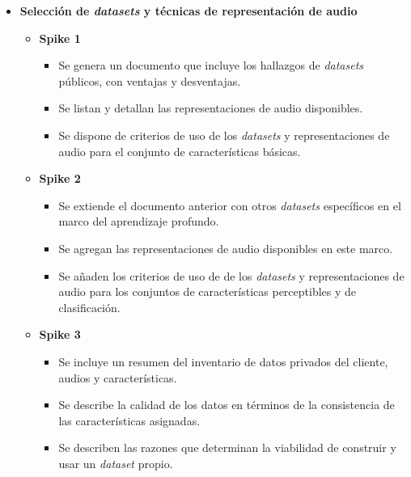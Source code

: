 \documentclass[
11pt, %
]{charter}
\begin{document}
\begin{itemize}
  \item \textbf{Selección de \textit{datasets} y técnicas de representación de audio}
    \begin{itemize}
      \item \textbf{Spike 1}
      \begin{itemize}
        \item Se genera un documento que incluye los hallazgos de \textit{datasets} públicos, con ventajas y desventajas.
        \item Se listan y detallan las representaciones de audio disponibles.
        \item Se dispone de criterios de uso de los \textit{datasets} y representaciones de audio para el conjunto de características básicas.
      \end{itemize}
      \item \textbf{Spike 2}
      \begin{itemize}
        \item Se extiende el documento anterior con otros \textit{datasets} específicos en el marco del aprendizaje profundo.
        \item Se agregan las representaciones de audio disponibles en este marco.
        \item Se añaden los criterios de uso de de los \textit{datasets} y representaciones de audio para los conjuntos de características perceptibles y de clasificación.
      \end{itemize}      
      \item \textbf{Spike 3}
      \begin{itemize}
        \item Se incluye un resumen del inventario de datos privados del cliente, audios y características.
        \item Se describe la calidad de los datos en términos de la consistencia de las características asignadas.
        \item Se describen las razones que determinan la viabilidad de construir y usar un \textit{dataset} propio.
      \end{itemize}   
    \end{itemize}


\end{itemize}
\end{document}
